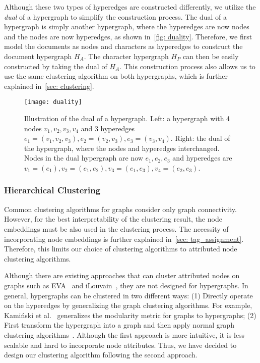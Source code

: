 Although these two types of hyperedges are constructed differently, we utilize the \textit{dual} of a hypergraph to simplify the construction process.
The dual of a hypergraph is simply another hypergraph, where the hyperedges are now nodes and the nodes are now hyperedges, as shown in~\autoref{fig: duality}.
Therefore, we first model the documents as nodes and characters as hyperedges to construct the document hypergraph $H_A$.
The character hypergraph $H_P$ can then be easily constructed by taking the dual of $H_A$.
This construction process also allows us to use the same clustering algorithm on both hypergraphs, which is further explained in~\autoref{sec: clustering}.

\begin{figure}
 \centering %
 \texttt{[image: duality]}
 \caption{Illustration of the dual of a hypergraph. 
 Left: a hypergraph with 4 nodes $v_1, v_2, v_3, v_4$ and 3 hyperedges $e_1=(v_1, v_2, v_3), e_2=(v_2, v_3), e_3=(v_3, v_4)$. 
 Right: the dual of the hypergraph, where the nodes and hyperedges interchanged.
 Nodes in the dual hypergraph are now $e_1, e_2, e_3$ and hyperedges are $v_1=(e_1), v_2=(e_1, e_2), v_3=(e_1, e_3), v_4=(e_2, e_3)$.
 }
\label{fig: duality}
\end{figure}

\subsubsection{Hierarchical Clustering}\label{sec: clustering}
Common clustering algorithms for graphs consider only graph connectivity.
However, for the best interpretability of the clustering result, the node embeddings must be also used in the clustering process.
The necessity of incorporating node embeddings is further explained in~\autoref{sec: tag_assignment}.
Therefore, this limits our choice of clustering algorithms to attributed node clustering algorithms.

Although there are existing approaches that can cluster attributed nodes on graphs such as EVA~\cite{citraro2020eva} and iLouvain~\cite{combe2015louvain}, they are not designed for hypergraphs.
In general, hypergraphs can be clustered in two different ways: 
(1) Directly operate on the hyperedges by generalizing the graph clustering algorithms.
For example, Kamiński et al.~\cite{kaminski2021hgraphcommunity} generalizes the modularity metric for graphs to hypergraphs; 
(2) First transform the hypergraph into a graph and then apply normal graph clustering algorithms~\cite{kumar2020new}.
Although the first approach is more intuitive, it is less scalable and hard to incorporate node attributes.
Thus, we have decided to design our clustering algorithm following the second approach.

